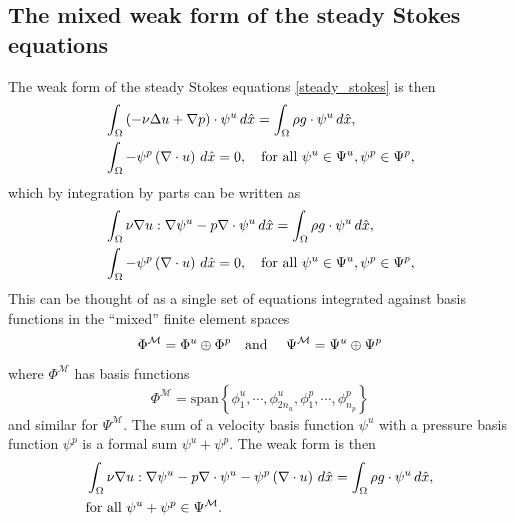\subsection{The mixed weak form of the steady Stokes equations}
The weak form of the steady Stokes equations \eqref{steady_stokes} is then
\begin{equation*}
\begin{split}
    &\int_{\Omega} \left(-\nu\Delta u + \nabla p\right)\cdot \psi^u\,d\hat{x} = \int_\Omega \rho g\cdot\psi^u\,d\hat{x},\\
    &\int_{\Omega} -\psi^p\left(\nabla\cdot u\right)\,d\hat{x} = 0, \quad\text{for all $\psi^u \in \Psi^u, \psi^p \in \Psi^p$},
\end{split}
\end{equation*}
which by integration by parts can be written as
\begin{equation}\label{steady_stokes_weak}
\begin{split}
    &\int_{\Omega} \nu\nabla u : \nabla \psi^u - p\nabla\cdot \psi^u\,d\hat{x} = \int_{\Omega} \rho g \cdot \psi^u\,d\hat{x},\\
    &\int_{\Omega} -\psi^p\left(\nabla\cdot u\right)\,d\hat{x} = 0, \quad\text{for all $\psi^u \in \Psi^u, \psi^p \in \Psi^p$},
\end{split}
\end{equation}
This can be thought of as a single set of equations integrated against basis functions in the ``mixed'' finite element spaces
    $$\Phi^\mathcal{M} = \Phi^u \oplus \Phi^p \text{\quad and \quad} \Psi^\mathcal{M} = \Psi^u \oplus \Psi^p$$
where $\Phi^\mathcal{M}$ has basis functions
\begin{equation}\label{mixed_space_basis_functions}
    \Phi^\mathcal{M} = \text{span}\left\{
        \phi^u_1,\cdots,\phi^u_{2n_u}, \phi_1^p,\cdots,\phi_{n_p}^p
    \right\}
\end{equation}
and similar for $\Psi^\mathcal{M}$.
The sum of a velocity basis function $\psi^u$ with a pressure basis function $\psi^p$ is a formal sum $\psi^u + \psi^p$. The weak form is then
\begin{equation}\label{steady_stokes_weak_mixed}
\begin{split}
    &\int_{\Omega} \nu\nabla u : \nabla \psi^u - p\nabla\cdot \psi^u
    -\psi^p\left(\nabla\cdot u\right)\,d\hat{x}
 = \int_{\Omega} \rho g \cdot \psi^u\,d\hat{x},\\
    &\text{for all $\psi^u + \psi^p \in \Psi^\mathcal{M}$}.
\end{split}
\end{equation}
